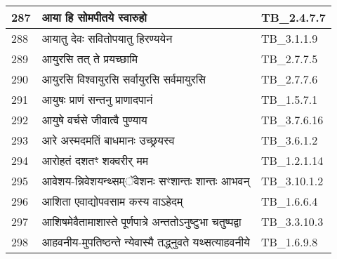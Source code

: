 \documentclass[17pt]{extarticle}
\begin{document}
\begin{longtable}{||p{0.4in}||p{4.9in}||p{0.9in}||}
    \hline
        
    287 & आया हि सोमपीतये स्वारुहो & TB\_2.4.7.7       \\
    
    \hline
        
    288 & आयातु देवः सवितोपयातु हिरण्ययेन & TB\_3.1.1.9       \\
    
    \hline
        
    289 & आयुरसि तत् ते प्रयच्छामि & TB\_2.7.7.5       \\
    
    \hline
        
    290 & आयुरसि विश्वायुरसि सर्वायुरसि सर्वमायुरसि & TB\_2.7.7.6       \\
    
    \hline
        
    291 & आयुषः प्राणं सन्तनु प्राणादपानं & TB\_1.5.7.1       \\
    
    \hline
        
    292 & आयुषे वर्चसे जीवात्वै पुण्याय & TB\_3.7.6.16       \\
    
    \hline
        
    293 & आरे अस्मदमतिं बाधमानः उच्छ्रयस्व & TB\_3.6.1.2       \\
    
    \hline
        
    294 & आरोहतं दशतꣳ शक्वरीर् मम & TB\_1.2.1.14       \\
    
    \hline
        
    295 & आवेशय{-}न्निवेशयन्थ्सम्ॅवेशनः सꣳशान्तः शान्तः आभवन् & TB\_3.10.1.2       \\
    
    \hline
        
    296 & आशिता एवाद्योपवसाम कस्य वाऽहेदम् & TB\_1.6.6.4       \\
    
    \hline
        
    297 & आशिषमेवैतामाशास्ते पूर्णपात्रे अन्ततोऽनुष्टुभा चतुष्पद्वा & TB\_3.3.10.3       \\
    
    \hline
        
    298 & आहवनीय{-}मुपतिष्ठन्ते न्येवास्मै तद्ध्नुवते यथ्सत्याहवनीये & TB\_1.6.9.8       \\
    
    \hline
        

\end{longtable}
\end{document}
